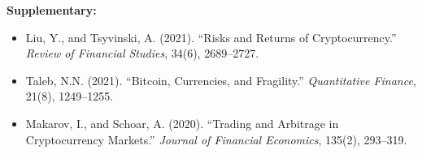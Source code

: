 \documentclass[11pt,a4paper]{article}
\begin{document}
\textbf{Supplementary:}
\begin{itemize}
    \item Liu, Y., and Tsyvinski, A. (2021). ``Risks and Returns of Cryptocurrency.'' \textit{Review of Financial Studies}, 34(6), 2689--2727.
    \item Taleb, N.N. (2021). ``Bitcoin, Currencies, and Fragility.'' \textit{Quantitative Finance}, 21(8), 1249--1255.
    \item Makarov, I., and Schoar, A. (2020). ``Trading and Arbitrage in Cryptocurrency Markets.'' \textit{Journal of Financial Economics}, 135(2), 293--319.
\end{itemize}

\end{document}
